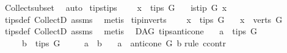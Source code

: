 \begin{isabellebody}
\ Collect{\isacharunderscore}{\kern0pt}subset\ \isamarkupfalse%
\ auto%
\endisatagproof
{\isafoldproof}%
%
\isadelimproof
%
\endisadelimproof
\isanewline
\isanewline
{}\isamarkupfalse%
\ tips{\isacharunderscore}{\kern0pt}tips{\isacharcolon}{\kern0pt}\ \isanewline
\ \ \ {\isachardoublequoteopen}x\ {\isasymin}\ tips\ G{\isachardoublequoteclose}\isanewline
\ \ \ {\isachardoublequoteopen}is{\isacharunderscore}{\kern0pt}tip\ G\ x{\isachardoublequoteclose}%
\isadelimproof
\ %
\endisadelimproof
%
\isatagproof
{}\isamarkupfalse%
\ tips{\isacharunderscore}{\kern0pt}def\ CollectD\ assms{\isacharparenleft}{\kern0pt}{}{\isacharparenright}{\kern0pt}\ \isamarkupfalse%
\ metis%
\endisatagproof
{\isafoldproof}%
%
\isadelimproof
%
\endisadelimproof
\isanewline
\isanewline
{}\isamarkupfalse%
\ tip{\isacharunderscore}{\kern0pt}in{\isacharunderscore}{\kern0pt}verts{\isacharcolon}{\kern0pt}\ \isanewline
\ \ \ {\isachardoublequoteopen}x\ {\isasymin}\ tips\ G{\isachardoublequoteclose}\isanewline
\ \ \ {\isachardoublequoteopen}x\ {\isasymin}\ verts\ G{\isachardoublequoteclose}%
\isadelimproof
\ %
\endisadelimproof
%
\isatagproof
{}\isamarkupfalse%
\ tips{\isacharunderscore}{\kern0pt}def\ CollectD\ assms{\isacharparenleft}{\kern0pt}{}{\isacharparenright}{\kern0pt}\ \isamarkupfalse%
\ metis%
\endisatagproof
{\isafoldproof}%
%
\isadelimproof
%
\endisadelimproof
%
\isadelimdocument
%
\endisadelimdocument
%
\isatagdocument
%
\isamarkuptrue%
%
\endisatagdocument
{\isafolddocument}%
%
\isadelimdocument
%
\endisadelimdocument
{}\isamarkupfalse%
\ {\isacharparenleft}{\kern0pt}\ DAG{\isacharparenright}{\kern0pt}\ tips{\isacharunderscore}{\kern0pt}anticone{\isacharcolon}{\kern0pt}\isanewline
\ \ \ {\isachardoublequoteopen}a\ {\isasymin}\ tips\ G{\isachardoublequoteclose}\isanewline
\ \ \ \ \ {\isachardoublequoteopen}b\ {\isasymin}\ tips\ G{\isachardoublequoteclose}\isanewline
\ \ \ \ \ {\isachardoublequoteopen}a\ {\isasymnoteq}\ b{\isachardoublequoteclose}\isanewline
\ \ \ {\isachardoublequoteopen}a\ {\isasymin}\ anticone\ G\ b{\isachardoublequoteclose}\isanewline
%
\isadelimproof
%
\endisadelimproof
%
\isatagproof
{}\isamarkupfalse%
{\isacharparenleft}{\kern0pt}rule\ ccontr{\isacharparenright}{\kern0pt}\isanewline
\ \ \isamarkupfalse%

\end{isabellebody}

